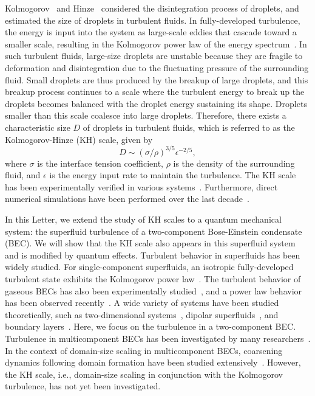 \documentclass[pra,aps,superscriptaddress,twocolumn]{revtex4-2}
\begin{document}
Kolmogorov~\cite{Kolmogorov49} and Hinze~\cite{Hinze} considered the
disintegration process of droplets, and estimated the size of droplets in
turbulent fluids.
In fully-developed turbulence, the energy is input into the system as
large-scale eddies that cascade toward a smaller scale, resulting in the
Kolmogorov power law of the energy spectrum~\cite{Frisch}.
In such turbulent fluids, large-size droplets are unstable because they are
fragile to deformation and disintegration due to the fluctuating pressure
of the surrounding fluid.
Small droplets are thus produced by the breakup of large droplets, and this
breakup process continues to a scale where the turbulent energy to break
up the droplets becomes balanced with the droplet energy sustaining its
shape.
Droplets smaller than this scale coalesce into large droplets.
Therefore, there exists a characteristic size $D$ of droplets in turbulent
fluids, which is referred to as the Kolmogorov-Hinze (KH) scale, given
by~\cite{Hinze}
\begin{equation} \label{Hinze}
D \sim (\sigma / \rho)^{3/5} \epsilon^{-2/5},
\end{equation}
where $\sigma$ is the interface tension coefficient, $\rho$ is the density
of the surrounding fluid, and $\epsilon$ is the energy input rate to
maintain the turbulence.
The KH scale has been experimentally verified in various systems~\cite{Clay,Shinnar, Sleicher, Arai, Deane}.
Furthermore, direct numerical simulations have been performed over the last
decade~\cite{Perlekar12, Skartlien, Perlekar14, Fan, Perlekar17, Rosti}.

In this Letter, we extend the study of KH scales to a quantum mechanical
system: the superfluid turbulence of a two-component Bose-Einstein
condensate (BEC).
We will show that the KH scale also appears in this superfluid system and
is modified by quantum effects.
Turbulent behavior in superfluids has been widely studied.
For single-component superfluids, an isotropic fully-developed turbulent
state exhibits the Kolmogorov power law~\cite{Nore, Stalp, Araki,Kobayashi, Parker, Baggaley}.
The turbulent behavior of gaseous BECs has also been experimentally
studied~\cite{Henn, Neely, Kwon}, and a power law behavior has been observed
recently~\cite{Thompson, Navon, Johnstone, Navon2}.
A wide variety of systems have been studied theoretically, such as
two-dimensional systems~\cite{Nazarenko, Horng, Numasato, Bradley, Reeves},
dipolar superfluids~\cite{Bland}, and boundary layers~\cite{Stagg}.
Here, we focus on the turbulence in a two-component BEC.
Turbulence in multicomponent BECs has been investigated by many
researchers~\cite{Berloff, Takeuchi, Fujimoto, Tsubota, Vill, Kobyakov,
  Kang}.
In the context of domain-size scaling in multicomponent BECs, coarsening
dynamics following domain formation have been studied
extensively~\cite{Karl, Kudo, Hofmann, De, Nicklas, Williamson, Bourges,
  Prufer, Fujimoto18, Takeuchi18, Symes}.
However, the KH scale, i.e., domain-size scaling in conjunction with
the Kolmogorov turbulence, has not yet been investigated.
\end{document}
